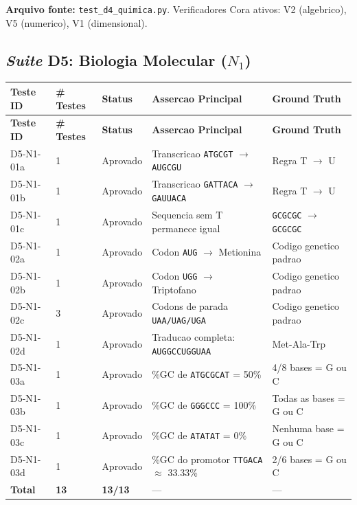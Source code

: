\textbf{Arquivo fonte:} \texttt{test\_d4\_quimica.py}. Verificadores Cora ativos: V2 (algebrico), V5 (numerico), V1 (dimensional).

\subsection{\textit{Suite} D5: Biologia Molecular ($N_1$)}

\begin{longtable}{|p{2.5cm}|p{2.0cm}|p{2.0cm}|p{3.5cm}|p{3.5cm}|}
\hline
\textbf{Teste ID} & \textbf{\# Testes} & \textbf{Status} & \textbf{Assercao Principal} & \textbf{Ground Truth} \\
\hline
\endfirsthead
\hline
\textbf{Teste ID} & \textbf{\# Testes} & \textbf{Status} & \textbf{Assercao Principal} & \textbf{Ground Truth} \\
\hline
\endhead
\hline
\endfoot
D5-N1-01a & 1 & Aprovado & Transcricao \texttt{ATGCGT} $\rightarrow$ \texttt{AUGCGU} & Regra T $\rightarrow$ U \\
\hline
D5-N1-01b & 1 & Aprovado & Transcricao \texttt{GATTACA} $\rightarrow$ \texttt{GAUUACA} & Regra T $\rightarrow$ U \\
\hline
D5-N1-01c & 1 & Aprovado & Sequencia sem T permanece igual & \texttt{GCGCGC} $\rightarrow$ \texttt{GCGCGC} \\
\hline
D5-N1-02a & 1 & Aprovado & Codon \texttt{AUG} $\rightarrow$ Metionina & Codigo genetico padrao \\
\hline
D5-N1-02b & 1 & Aprovado & Codon \texttt{UGG} $\rightarrow$ Triptofano & Codigo genetico padrao \\
\hline
D5-N1-02c & 3 & Aprovado & Codons de parada \texttt{UAA/UAG/UGA} & Codigo genetico padrao \\
\hline
D5-N1-02d & 1 & Aprovado & Traducao completa: \texttt{AUGGCCUGGUAA} & Met-Ala-Trp \\
\hline
D5-N1-03a & 1 & Aprovado & \%GC de \texttt{ATGCGCAT} = 50\% & 4/8 bases = G ou C \\
\hline
D5-N1-03b & 1 & Aprovado & \%GC de \texttt{GGGCCC} = 100\% & Todas as bases = G ou C \\
\hline
D5-N1-03c & 1 & Aprovado & \%GC de \texttt{ATATAT} = 0\% & Nenhuma base = G ou C \\
\hline
D5-N1-03d & 1 & Aprovado & \%GC do promotor \texttt{TTGACA} $\approx$ 33.33\% & 2/6 bases = G ou C \\
\hline
\textbf{Total} & \textbf{13} & \textbf{13/13} & --- & --- \\
\hline
\end{longtable}

